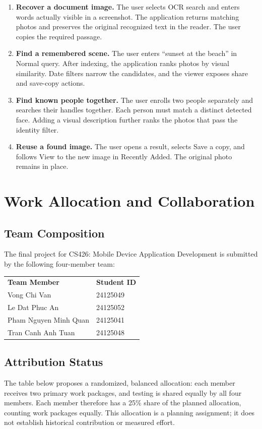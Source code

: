 \documentclass[11pt,a4paper]{article}
\newcommand{\reportsection}[1]{\section{#1}}
\newcommand{\CourseCode}{CS426}
\newcommand{\CourseTitle}{Mobile Device Application Development}
\newcommand{\TeamMembers}{%
  \begin{tabular}{ll}
  \textbf{Team Member} & \textbf{Student ID}\\[5pt]
  Vong Chi Van & 24125049\\[3pt]
  Le Dat Phuc An & 24125052\\[3pt]
  Pham Nguyen Minh Quan & 24125041\\[3pt]
  Tran Canh Anh Tuan & 24125048
  \end{tabular}%
}
\begin{document}
\begin{enumerate}
\item \textbf{Recover a document image.} The user selects OCR search and enters words actually visible in a screenshot. The application returns matching photos and preserves the original recognized text in the reader. The user copies the required passage.
\item \textbf{Find a remembered scene.} The user enters “sunset at the beach” in Normal query. After indexing, the application ranks photos by visual similarity. Date filters narrow the candidates, and the viewer exposes share and save-copy actions.
\item \textbf{Find known people together.} The user enrolls two people separately and searches their handles together. Each person must match a distinct detected face. Adding a visual description further ranks the photos that pass the identity filter.
\item \textbf{Reuse a found image.} The user opens a result, selects Save a copy, and follows View to the new image in Recently Added. The original photo remains in place.
\end{enumerate}
\reportsection{Work Allocation and Collaboration}
\label{sec:division}

\subsection{Team Composition}
The final project for \CourseCode{}: \CourseTitle{} is submitted by the following four-member team:

\begin{center}
\TeamMembers
\end{center}

\subsection{Attribution Status}
The table below proposes a randomized, balanced allocation: each member receives two primary work packages, and testing is shared equally by all four members. Each member therefore has a 25\% share of the planned allocation, counting work packages equally. This allocation is a planning assignment; it does not establish historical contribution or measured effort.
\end{document}
